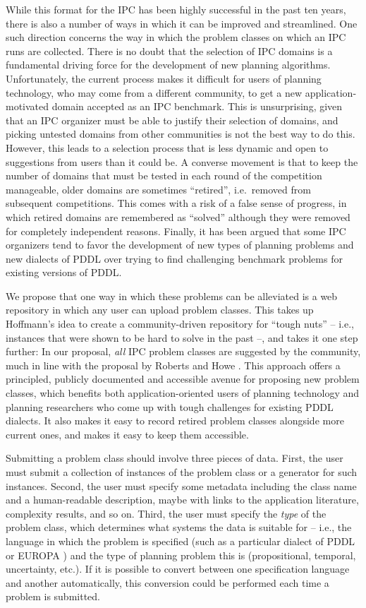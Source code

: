 While this format for the IPC has been highly successful in the past
ten years, there is also a number of ways in which it can be improved
and streamlined.  One such direction concerns the way in which the
problem classes on which an IPC runs are collected.  There is no doubt
that the selection of IPC domains is a fundamental driving force for
the development of new planning algorithms.  Unfortunately, the
current process makes it difficult for users of planning technology,
who may come from a different community, to get a new
application-motivated domain accepted as an IPC benchmark.  This is
unsurprising, given that an IPC organizer must be able to justify
their selection of domains, and picking untested domains from other
communities is not the best way to do this.  However, this leads to a
selection process that is less dynamic and open to suggestions from
users than it could be.  A converse movement is that to keep the
number of domains that must be tested in each round of the competition
manageable, older domains are sometimes ``retired'', i.e.\ removed
from subsequent competitions.  This comes with a risk of a false sense
of progress, in which retired domains are remembered as ``solved''
although they were removed for completely independent reasons.
Finally, it has been argued \cite{ToughNuts} that some IPC organizers
tend to favor the development of new types of planning problems and
new dialects of PDDL over trying to find challenging benchmark
problems for existing versions of PDDL.

We propose that one way in which these problems can be alleviated is a
web repository in which any user can upload problem classes.  This
takes up Hoffmann's  idea to create a
community-driven repository for ``tough nuts'' -- i.e., instances that
were shown to be hard to solve in the past --, and takes it one step
further: In our proposal, \emph{all} IPC problem classes are suggested
by the community, much in line with the proposal by Roberts and Howe
. This approach offers a
principled, publicly documented and accessible avenue for proposing
new problem classes, which benefits both application-oriented users of
planning technology and planning researchers who come up with tough
challenges for existing PDDL dialects. It also makes it easy to record
retired problem classes alongside more current ones, and makes it easy
to keep them accessible.

Submitting a problem class should involve three pieces of data. First,
the user must submit a collection of instances of the problem class or
a generator for such instances.  Second, the user must specify some
metadata including the class name and a human-readable description,
maybe with links to the application literature, complexity results,
and so on.  Third, the user must specify the \emph{type} of the
problem class, which determines what systems the data is suitable for
-- i.e., the language in which the problem is specified (such as a
particular dialect of PDDL or EUROPA ) and the type of
planning problem this is (propositional, temporal, uncertainty,
etc.).  If it is possible to convert between one specification
language and another automatically, this conversion could be performed
each time a problem is submitted.

